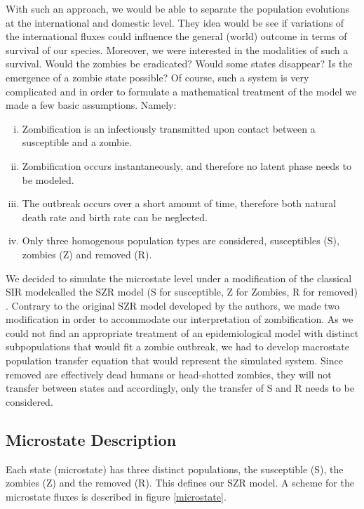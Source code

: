 \documentclass[11pt]{article} %
\begin{document}
With such an approach, we would be able to separate the population evolutions at the international and domestic level. They idea would be see if variations of the international fluxes could influence the general (world) outcome in terms of survival of our species. Moreover, we were interested in the modalities of such a survival. Would the zombies be eradicated? Would some states disappear? Is the emergence of a zombie state possible? Of course, such a system is very complicated and in order to formulate a mathematical treatment of the model we made a few basic assumptions. Namely:
\begin{enumerate}[i.]
	\item Zombification is an infectiously transmitted upon contact between a susceptible and a zombie.
	\item Zombification occurs instantaneously, and therefore no latent phase needs to be modeled.
	\item The outbreak occurs over a short amount of time, therefore both natural death rate and birth rate can be neglected.
	\item Only three homogenous population types are considered, susceptibles (S), zombies (Z) and removed (R).
\end{enumerate}

We decided to simulate the microstate level under a modification of the classical SIR modelcalled the SZR model (S for susceptible, Z for Zombies, R for removed) \cite{munz2009zombies}. Contrary to the original SZR model developed by the authors, we made two modification in order to accommodate our interpretation of zombification. As we could not find an appropriate treatment of an epidemiological model with distinct subpopulations that would fit a zombie outbreak, we had to develop macrostate population transfer equation that would represent the simulated system. Since removed are effectively dead humans or head-shotted zombies, they will not transfer between states and accordingly, only the transfer of S and R needs to be considered. 

\subsection{Microstate Description}\indent
\label{sec:microdescription}

Each state (microstate) has three distinct populations, the susceptible (S), the zombies (Z) and the removed (R). This defines our SZR model. A scheme for the microstate fluxes is described in figure \ref{microstate}.
\end{document}
